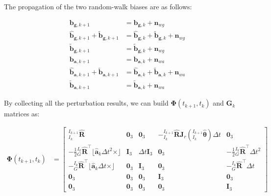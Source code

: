The propagation of the two random-\/walk biases are as follows\+:

\begin{align*} \mathbf{b}_{\mathbf{g},k+1} &= \mathbf{b}_{\mathbf{g},k} + \mathbf{n}_{wg} \\ \hat{\mathbf{b}}_{\mathbf{g},k+1} + \tilde{\mathbf{b}}_{\mathbf{g},k+1} &= \hat{\mathbf{b}}_{\mathbf{g},k} + \tilde{\mathbf{b}}_{\mathbf{g},k} + \mathbf{n}_{wg} \\ \tilde{\mathbf{b}}_{\mathbf{g},k+1} &= \tilde{\mathbf{b}}_{\mathbf{g},k} + \mathbf{n}_{wg} \\[1em] \mathbf{b}_{\mathbf{a},k+1} &= \mathbf{b}_{\mathbf{a},k} + \mathbf{n}_{wa} \\ \hat{\mathbf{b}}_{\mathbf{a},k+1} + \tilde{\mathbf{b}}_{\mathbf{a},k+1} &= \hat{\mathbf{b}}_{\mathbf{a},k} + \tilde{\mathbf{b}}_{\mathbf{a},k} + \mathbf{n}_{wa} \\ \tilde{\mathbf{b}}_{\mathbf{a},k+1} &= \tilde{\mathbf{b}}_{\mathbf{a},k} + \mathbf{n}_{wa} \end{align*}

By collecting all the perturbation results, we can build $\boldsymbol{\Phi}(t_{k+1},t_k)$ and $\mathbf{G}_{k}$ matrices as\+:

\begin{align*} \boldsymbol{\Phi}(t_{k+1},t_k) &= \begin{bmatrix} \text{}^{I_{k+1}}_{I_{k}}\hat{\mathbf{R}} & \mathbf{0}_3 & \mathbf{0}_3 & - \text{}^{I_{k+1}}_{I_{k}}\hat{\mathbf{R}}\mathbf J_r(\text{}^{I_{k+1}}_{I_{k}}\hat{\boldsymbol{\theta}}) \Delta t & \mathbf{0}_3 \\ - \frac{1}{2}\text{}^{I_k}_{G}\hat{\mathbf{R}}^\top \lfloor \hat{\mathbf{a}}_{k} \Delta t^2 \times\rfloor & \mathbf{I}_3 & \Delta t \mathbf{I}_3 & \mathbf{0}_3 & - \frac{1}{2} \text{}^{I_k}_{G}\hat{\mathbf{R}}^\top \Delta t^2 \\ - \text{}^{I_k}_G\hat{\mathbf{R}}^\top \lfloor \hat{\mathbf{a}}_{k} \Delta t \times\rfloor & \mathbf{0}_3 & \mathbf{I}_3 & \mathbf{0}_3 & - \text{}^{I_k}_G\hat{\mathbf{R}}^\top \Delta t \\ \mathbf{0}_3 & \mathbf{0}_3 & \mathbf{0}_3 & \mathbf{I}_3 & \mathbf{0}_3 \\ \mathbf{0}_3 & \mathbf{0}_3 & \mathbf{0}_3 & \mathbf{0}_3 & \mathbf{I}_3 \end{bmatrix} \end{align*}

